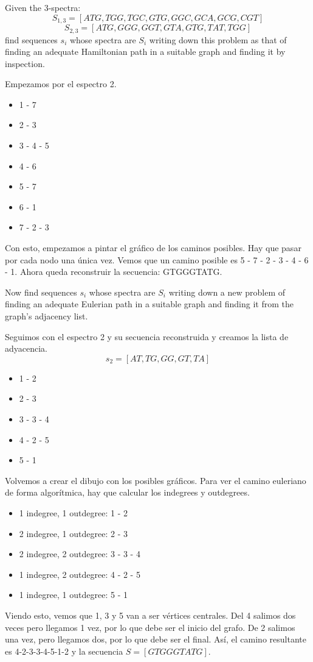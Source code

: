 \documentclass[nochap]{config/ejercicios}
\begin{document}
\begin{problemS} 
Given the 3-spectra:
$$S_{1,3} = [ATG, TGG, TGC, GTG, GGC, GCA, GCG, CGT]$$
$$S_{2,3} = [ATG, GGG, GGT, GTA, GTG, TAT, TGG]$$
find sequences $s_i$ whose spectra are $S_i$ writing down this problem as that of finding an adequate Hamiltonian path in a suitable graph and finding it by inspection.

Empezamos por el espectro 2.
\begin{itemize}
\item 1 - 7
\item 2 - 3
\item 3 - 4 - 5
\item 4 - 6
\item 5 - 7
\item 6 - 1
\item 7 - 2 - 3
\end{itemize}
Con esto, empezamos a pintar el gráfico de los caminos posibles. Hay que pasar por cada nodo una única vez. Vemos que un camino posible es 5 - 7 - 2 - 3 - 4 - 6 - 1. Ahora queda reconstruir la secuencia: GTGGGTATG.
\end{problemS}

\begin{problemS} 
Now find sequences $s_i$ whose spectra are $S_i$ writing down a new problem of finding an adequate Eulerian path in a suitable graph and finding it from the graph's adjacency list.

Seguimos con el espectro 2 y su secuencia reconstruida y creamos la lista de adyacencia.
$$s_2 = [AT, TG, GG, GT, TA]$$
\begin{itemize}
\item 1 - 2
\item 2 - 3
\item 3 - 3 - 4
\item 4 - 2 - 5
\item 5 - 1
\end{itemize}
Volvemos a crear el dibujo con los posibles gráficos. Para ver el camino euleriano de forma algorítmica, hay que calcular los indegrees y outdegrees.
\begin{itemize}
\item 1 indegree, 1 outdegree: 1 - 2
\item 2 indegree, 1 outdegree: 2 - 3
\item 2 indegree, 2 outdegree: 3 - 3 - 4
\item 1 indegree, 2 outdegree: 4 - 2 - 5
\item 1 indegree, 1 outdegree: 5 - 1
\end{itemize}
Viendo esto, vemos que 1, 3 y 5 van a ser vértices centrales. Del 4 salimos dos veces pero llegamos 1 vez, por lo que debe ser el inicio del grafo. De 2 salimos una vez, pero llegamos dos, por lo que debe ser el final. Así, el camino resultante es 4-2-3-3-4-5-1-2 y la secuencia $S = [GTGGGTATG]$.
\end{problemS}
\end{document}
